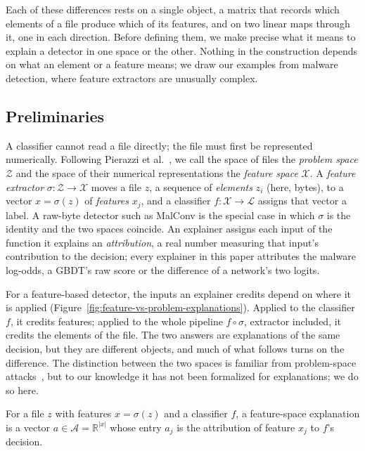 Each of these differences rests on a single object, a matrix that records which elements of a file produce which of
its features, and on two linear maps through it, one in each direction. Before defining them, we make precise what it
means to explain a detector in one space or the other. Nothing in the construction depends on what an element or a
feature means; we draw our examples from malware detection, where feature extractors are unusually complex.

\subsection{Preliminaries}
\label{sec:XML:Preliminaries}

A classifier cannot read a file directly; the file must first be represented numerically. Following Pierazzi et
al.~\cite{pierazzi2020intriguing}, we call the space of files the \emph{problem space} $\mathcal{Z}$ and the space of
their numerical representations the \emph{feature space} $\mathcal{X}$. A \emph{feature extractor}
$\sigma: \mathcal{Z} \to \mathcal{X}$ moves a file $z$, a sequence of \emph{elements} $z_i$ (here, bytes), to a vector
$x = \sigma(z)$ of \emph{features} $x_j$, and a classifier $f: \mathcal{X} \to \mathcal{L}$ assigns that vector a
label. A raw-byte detector such as MalConv is the special case in which $\sigma$ is the identity and the two spaces
coincide. An explainer assigns each input of the function it explains an \emph{attribution}, a real number measuring
that input's contribution to the decision; every explainer in this paper attributes the malware log-odds, a GBDT's raw
score or the difference of a network's two logits.

For a feature-based detector, the inputs an explainer credits depend on where it is applied
(Figure~\ref{fig:feature-vs-problem-explanations}). Applied to the classifier $f$, it credits features; applied to
the whole pipeline $f \circ \sigma$, extractor included, it credits the elements of the file. The two answers are
explanations of the same decision, but they are different objects, and much of what follows turns on the difference.
The distinction between the two spaces is familiar from problem-space attacks~\cite{pierazzi2020intriguing}, but to our
knowledge it has not been formalized for explanations; we do so here.

\label{def:FeatureSpaceExplanation}
{
For a file $z$ with features $x = \sigma(z)$ and a classifier $f$, a feature-space explanation is a vector
$a \in \mathcal{A} = \mathbb{R}^{|x|}$ whose entry $a_j$ is the attribution of feature $x_j$ to $f$'s decision.
}

